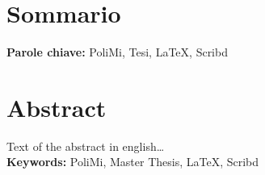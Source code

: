 %
%
\cleardoublepage
%
%

%
\chapter*{Sommario}

\medskip
%
\noindent \textbf{Parole chiave:} 
PoliMi,
Tesi,
LaTeX,
Scribd
%
\cleardoublepage
%
%
%
%
\chapter*{Abstract}
%
Text of the abstract in english\dots\\

\medskip
%
\noindent \textbf{Keywords:} 
PoliMi,
Master Thesis,
LaTeX,
Scribd
%
%
